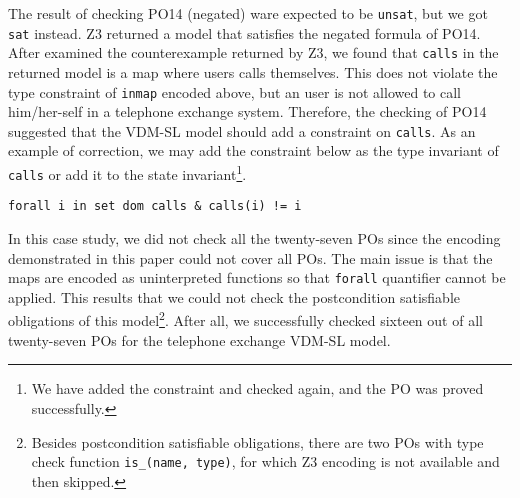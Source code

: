 The result of checking PO14 (negated) ware expected to be {\tt unsat}, but we got {\tt sat} instead. Z3 returned a model that satisfies the negated formula of PO14. After examined the counterexample returned by Z3, we found that {\tt calls} in the returned model is a map where users calls themselves. This does not violate the type constraint of {\tt inmap} encoded above, but an user is not allowed to call him/her-self in a telephone exchange system. Therefore, the checking of PO14 suggested that the VDM-SL model should add a constraint on {\tt calls}. As an example of correction, we may add the constraint below as the type invariant of {\tt calls} or add it to the state invariant\footnote{We have added the constraint and checked again, and the PO was proved successfully.}.

\begin{mdframed}[roundcorner=5pt]
\begin{Verbatim}[fontsize=\small]
forall i in set dom calls & calls(i) != i
\end{Verbatim}
\end{mdframed}

In this case study, we did not check all the twenty-seven POs since the encoding demonstrated in this paper could not cover all POs. The main issue is that the maps are encoded as uninterpreted functions so that {\tt forall} quantifier cannot be applied. This results that we could not check the postcondition satisfiable obligations of this model\footnote{Besides postcondition satisfiable obligations, there are two POs with type check function {\tt is\_(name, type)}, for which Z3 encoding is not available and then skipped.}. After all, we successfully checked sixteen out of all twenty-seven POs for the telephone exchange VDM-SL model.



